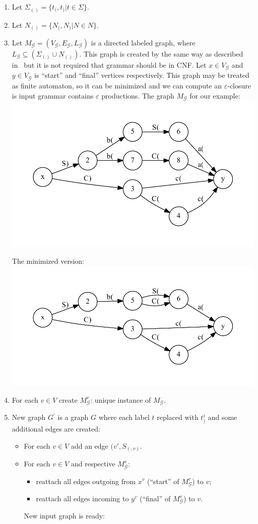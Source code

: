 \documentclass[12pt]{article}  %
\theoremstyle{definition}
\theoremstyle{remark}
\begin{document}
\begin{enumerate}
\item Let $\Sigma_{()} =\{ t_( , t_)  | t \in \Sigma \}$.
\item Let $N_{()} = \{ N_( , N_) | N \in N  \}$.
\item Let $M_{\mathcal{G}} = (V_{\mathcal{G}}, E_{\mathcal{G}}, L_{\mathcal{G}})$ is a directed 
labeled graph, where $L_{\mathcal{G}} \subseteq (\Sigma_{()} \cup N_{()})$.
This graph is created by the same way as described in~\cite{OptimalDLR} but it is not required that grammar should be in CNF.
Let $x \in V_{\mathcal{G}}$ and $y \in V_{\mathcal{G}}$ is ``start'' and ``final'' vertices respectively. 
This graph may be treated as finite automaton, so it can be minimized and we can compute an $\varepsilon$-closure is input grammar contains $\varepsilon$ productions.
The graph $M_{\mathcal{G}}$ for our example:
\\
\includegraphics[width=.7\textwidth]{dot/grammar_1.pdf}


The minimized version:
\\
\includegraphics[width=.7\textwidth]{dot/grammar_min.pdf}


\item For each $v \in V$ create $M_{\mathcal{G}}^v$: unique instance of $M_{\mathcal{G}}$.
\item New graph $G^{'}$ is a graph $G$ where each label $t$ replaced with $t_{)}^i$ and some additional edges are created:
\begin{itemize}
\item For each $v \in V$ add an edge $(v', S_(, v)$. 
\item For each $v \in V$ and respective $M_{\mathcal{G}}^v$:
  \begin{itemize}
    \item reattach all edges outgoing from $x^v$ (``start'' of $M_{\mathcal{G}}^v$) to $v$;
	\item reattach all edges incoming to $y^v$ (``final'' of $M_{\mathcal{G}}^v$) to $v$.	
  \end{itemize}
  New input graph is ready:
  

\end{itemize}
\end{enumerate}
\end{document}
